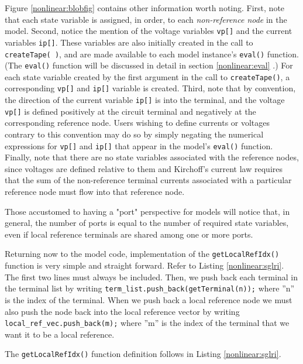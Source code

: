 Figure \ref{nonlinear:blobfig} contains other information worth
noting.  First, note that each state variable is assigned, in
order, to each \emph{non-reference node} in the model.  Second,
notice the mention of the voltage variables \texttt{vp[]}
and the current variables \texttt{ip[]}.  These variables are
also initially created in the call to \texttt{createTape(~)},
and are made available to each model instance's \texttt{eval()}
function.  (The \texttt{eval()} function will be discussed in detail
in section \ref{nonlinear:eval} .)  For each state variable created
by the first argument in the call to \texttt{createTape()}, a
corresponding \texttt{vp[]} and \texttt{ip[]} variable is created.
Third, note that by convention, the direction of the current
variable \texttt{ip[]} is into the terminal, and the
voltage \texttt{vp[]} is defined positively at the circuit terminal
and negatively at the corresponding reference node.  Users wishing
to define currents or voltages contrary to this convention may do
so by simply negating the numerical expressions for \texttt{vp[]}
and \texttt{ip[]} that appear in the model's \texttt{eval()}
function.  Finally, note that there are no state variables associated
with the reference nodes, since voltages are defined relative to
them and Kirchoff's current law requires that the sum of the
non-reference terminal currents associated with a particular reference
node must flow into that reference node.

Those accustomed to having a "port" perspective for models will
notice that, in general, the number of ports is equal to the number
of required state variables, even if local reference terminals
are shared among one or more ports.

Returning now to the model code, implementation of the
\texttt{getLocalRefIdx()} function is very simple and straight
forward.  Refer to Listing \ref{nonlinear:sglri}.  The first
two lines must always be included. Then, we push back each
terminal in the terminal list by writing
\texttt{term\_list.push\_back(getTerminal(n));} where ''n'' is
the index of the terminal.  When we push back a local reference
node we must also push the node back into the local reference
vector by writing
\texttt{local\_ref\_vec.push\_back(m);} where ''m'' is the index
of the terminal that we want it to be a local reference.

The \texttt{getLocalRefIdx()} function definition follows in Listing
\ref{nonlinear:sglri}.

